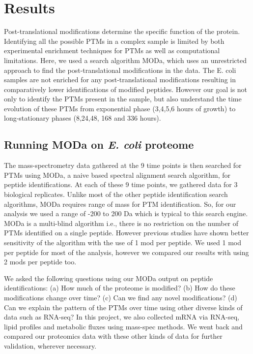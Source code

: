 \documentclass[12pt]{article}
\begin{document}
\section{Results}

Post-translational modifications determine the specific function of the protein. Identifying all the possible PTMs in a complex sample is limited by both experimental enrichment techniques for PTMs as well as computational limitations. Here, we used a search algorithm MODa, which uses an unrestricted approach to find the post-translational modifications in the data. The E. coli samples are not enriched for any post-translational modifications resulting in comparatively lower identifications of modified peptides. However our goal is not only to identify the PTMs present in the sample, but also understand the time evolution of these PTMs from exponential phase (3,4,5,6 hours of growth) to long-stationary phases (8,24,48, 168 and 336 hours).
 
\subsection{Running MODa on \emph{E. coli} proteome}
The mass-spectrometry data gathered at the 9 time points is then searched for PTMs using MODa, a naive based spectral alignment search algorithm, for peptide identifications. At each of these 9 time points, we gathered data for 3 biological replicates. Unlike most of the other peptide identification search algorithms, MODa requires range of mass for PTM identification. So, for our analysis we used a range of -200 to 200 Da which is typical to this search engine. MODa is a multi-blind algorithm i.e., there is no restriction on the  number of PTMs identified on a single peptide. However previous studies have shown better sensitivity of the algorithm with the use of 1 mod per peptide. We used 1 mod per peptide for most of the analysis, however we compared our results with using 2 mods per peptide too.

We asked the following questions using our MODa output on peptide identifications:
(a) How much of the proteome is modified? (b) How do these modifications change over time? (c) Can we find any novel modifications? (d) Can we explain the pattern of the PTMs over time using other diverse kinds of data such as RNA-seq? In this project, we also collected mRNA via RNA-seq, lipid profiles and metabolic fluxes using mass-spec methods. We went back and compared our proteomics data with these other kinds of data for further validation, wherever necessary.
\end{document}
